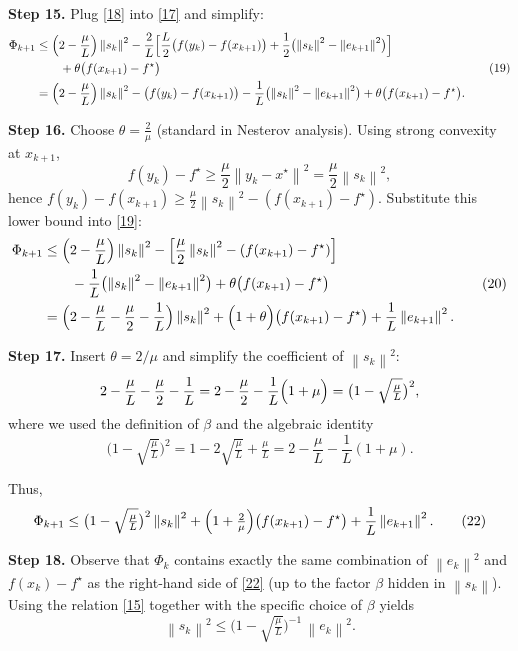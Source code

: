 \documentclass[11pt]{article}
\newcommand{\norm}[1]{\left\|#1\right\|}
\begin{document}
\noindent\textbf{Step 15.} Plug \eqref{18} into \eqref{17} and simplify:
\[
\begin{aligned}
\Phi_{k+1}
&\le \Bigl(2-\frac{\mu}{L}\Bigr)\norm{s_k}^2
   -\frac{2}{L}\Bigl[\frac{L}{2}\bigl(f(y_k)-f(x_{k+1})\bigr)
                     +\frac{1}{2}\bigl(\norm{s_k}^2-\norm{e_{k+1}}^2\bigr)\Bigr] \\
&\qquad +\theta\bigl(f(x_{k+1})-f^\star\bigr) \\
&= \Bigl(2-\frac{\mu}{L}\Bigr)\norm{s_k}^2
   -\bigl(f(y_k)-f(x_{k+1})\bigr)
   -\frac{1}{L}\bigl(\norm{s_k}^2-\norm{e_{k+1}}^2\bigr)
   +\theta\bigl(f(x_{k+1})-f^\star\bigr) .
\end{aligned}
\tag{19}
\]

\noindent\textbf{Step 16.} Choose $\theta = \frac{2}{\mu}$ (standard in Nesterov analysis). Using strong convexity at $x_{k+1}$,
\[
f(y_k)-f^\star \ge \frac{\mu}{2}\norm{y_k-x^\star}^2 = \frac{\mu}{2}\norm{s_k}^2,
\]
hence $f(y_k)-f(x_{k+1}) \ge \frac{\mu}{2}\norm{s_k}^2 - (f(x_{k+1})-f^\star)$. Substitute this lower bound into \eqref{19}:
\[
\begin{aligned}
\Phi_{k+1}
&\le \Bigl(2-\frac{\mu}{L}\Bigr)\norm{s_k}^2
   -\Bigl[\frac{\mu}{2}\norm{s_k}^2 - (f(x_{k+1})-f^\star)\Bigr] \\
&\qquad -\frac{1}{L}\bigl(\norm{s_k}^2-\norm{e_{k+1}}^2\bigr)
   +\theta\bigl(f(x_{k+1})-f^\star\bigr) \\
&= \Bigl(2-\frac{\mu}{L}-\frac{\mu}{2}-\frac{1}{L}\Bigr)\norm{s_k}^2
   +\Bigl(1+\theta\Bigr)\bigl(f(x_{k+1})-f^\star\bigr)
   +\frac{1}{L}\norm{e_{k+1}}^2 .
\end{aligned}
\tag{20}
\]

\noindent\textbf{Step 17.} Insert $\theta=2/\mu$ and simplify the coefficient of $\norm{s_k}^2$:
\[
2-\frac{\mu}{L}-\frac{\mu}{2}-\frac{1}{L}
= 2-\frac{\mu}{2}-\frac{1}{L}\Bigl(1+\mu\Bigr)
= \bigl(1-\sqrt{\tfrac{\mu}{L}}\bigr)^2 ,
\]
where we used the definition of $\beta$ and the algebraic identity
\[
\bigl(1-\sqrt{\tfrac{\mu}{L}}\bigr)^2 = 1 - 2\sqrt{\tfrac{\mu}{L}} + \tfrac{\mu}{L}
= 2-\frac{\mu}{L}-\frac{1}{L}(1+\mu) .
\tag{21}
\]

Thus,
\[
\Phi_{k+1}\le \bigl(1-\sqrt{\tfrac{\mu}{L}}\bigr)^2 \norm{s_k}^2
            +\Bigl(1+\tfrac{2}{\mu}\Bigr)\bigl(f(x_{k+1})-f^\star\bigr)
            +\frac{1}{L}\norm{e_{k+1}}^2 .
\tag{22}
\]

\noindent\textbf{Step 18.} Observe that $\Phi_k$ contains exactly the same combination of $\norm{e_k}^2$ and $f(x_k)-f^\star$ as the right‑hand side of \eqref{22} (up to the factor $\beta$ hidden in $\norm{s_k}$). Using the relation \eqref{15} together with the specific choice of $\beta$ yields
\[
\norm{s_k}^2 \le \bigl(1-\sqrt{\tfrac{\mu}{L}}\bigr)^{-1}\,\norm{e_k}^2 .
\tag{23}
\]
\end{document}
